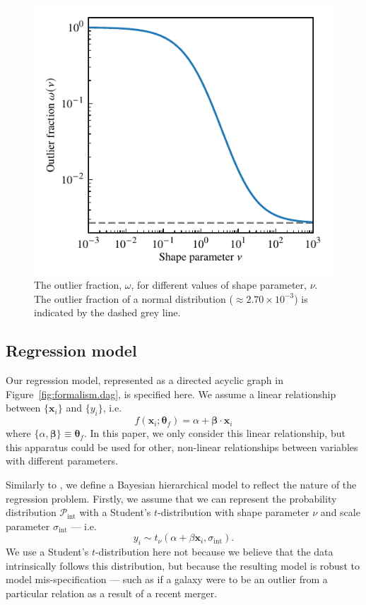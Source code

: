 \documentclass[fleqn,usenatbib]{rasti}
\newcommand{\studentt}[2]{t_\nu \left( #1, #2 \right)}
\newcommand{\depvar}{y_i}
\newcommand{\indepvars}{\boldsymbol{x}_i}
\newcommand{\intscttr}{\sigma_{\text{int}}}
\newcommand{\intercept}{\alpha}
\newcommand{\covariate}{\beta}
\begin{document}
\begin{figure}
	\includegraphics{graphics/outlier_frac.pdf}
    \caption{The outlier fraction, $\omega$, for different values of shape
    parameter, $\nu$. The outlier fraction of a normal distribution ($\approx
    2.70 \times 10^{-3}$) is indicated by the dashed grey line.}
    \label{fig:model.t}
\end{figure}

\subsection{Regression model}
\label{sec:formalism.model}

Our regression model, represented as a directed acyclic graph in Figure~\ref{fig:formalism.dag}, is specified here.
We assume a linear relationship between
$\{\boldsymbol{x}_i\}$ and $\{y_i\}$, i.e.
\begin{equation}
    f(\boldsymbol{x}_i; \boldsymbol{\theta}_f) =
        \alpha + \boldsymbol{\beta} \cdot \boldsymbol{x}_i
\end{equation}
where $\{\alpha, \boldsymbol{\beta}\} \equiv \boldsymbol{\theta}_f$. In this
paper, we only consider this linear relationship, but this apparatus could be
used for other, non-linear relationships between variables with different
parameters.

Similarly to \citet{Kelly:2007}, we define a Bayesian hierarchical model to
reflect the nature of the regression problem. Firstly, we assume that we can
represent the probability distribution $\mathcal P_{\text{int}}$ with a
Student's $t$-distribution with shape parameter $\nu$ and scale parameter
$\sigma_{\text{int}}$ --- i.e.
\begin{equation}
\depvar \sim \studentt{\intercept + \covariate \indepvars}{\intscttr}.
\end{equation}
We use a Student's $t$-distribution here not because we believe that the data
intrinsically follows this distribution, but because the resulting model is
robust to model mis-specification --- such as if a galaxy were
to be an outlier from a particular relation as a result of a recent merger.
\end{document}
